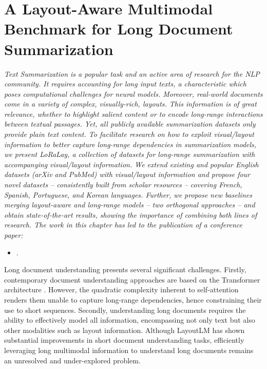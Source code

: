 
\chapter{A Layout-Aware Multimodal Benchmark for Long Document Summarization}
\label{chapter:chapter5}

\renewcommand{\leftmark}{\spacedlowsmallcaps{A Long and Layout-Aware Multimodal Benchmark for Text Summarization}}

\begin{chapabstract}
    {\em
    Text Summarization is a popular task and an active area of research for the \ac{NLP} community. It requires accounting for long input texts, a characteristic which poses computational challenges for neural models. 
    Moreover, real-world documents come in a variety of complex, visually-rich, layouts. This information is of great relevance, whether to highlight salient content or to encode long-range interactions between textual passages. Yet, all publicly available summarization datasets only provide plain text content.
    To facilitate research on how to exploit visual/layout information to better capture long-range dependencies in summarization models, we present \textit{LoRaLay}, a collection of datasets for long-range summarization with accompanying visual/layout information. We extend existing and popular English datasets (arXiv and PubMed) with visual/layout information and propose four novel datasets -- consistently built from scholar resources -- covering French, Spanish, Portuguese, and Korean languages.
    Further, we propose new baselines merging layout-aware and long-range models -- two orthogonal approaches -- and obtain state-of-the-art results, showing the importance of combining both lines of research.
    \vspace*{5mm}
    The work in this chapter has led to the publication of a conference paper:}
    \begin{itemize}
        \item \small {}.
    \end{itemize}
\end{chapabstract}



\newpage

\minitoc
{}

Long document understanding presents several significant challenges. Firstly, contemporary document understanding approaches are based on the Transformer architecture \citep{vaswani2017attention}. However, the quadratic complexity inherent to self-attention renders them unable to capture long-range dependencies, hence constraining their use to short sequences. Secondly, understanding long documents requires the ability to effectively model all information, encompassing not only text but also other modalities such as layout information. Although LayoutLM \citep{xu2020layoutlm} has shown substantial improvements in short document understanding tasks, efficiently leveraging long multimodal information to understand long documents remains an unresolved and under-explored problem.

